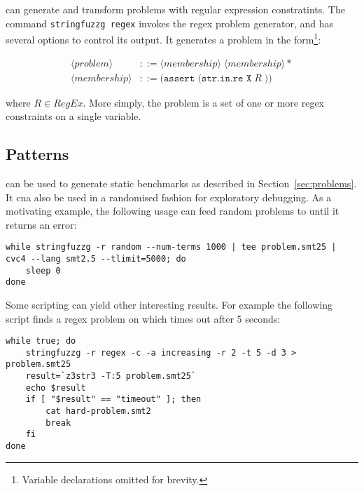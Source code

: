         \fuzzer{} can generate and transform problems with regular expression constratints. The command \texttt{stringfuzzg regex} invokes the regex problem generator, and has several options to control its output. It generates a problem in the form\footnote{Variable declarations omitted for brevity.}:

        \begin{align*}
            \langle problem \rangle  & ::= \langle membership \rangle \; \langle membership \rangle * \\
            \langle membership \rangle & ::= \texttt{(assert (str.in.re X}\; R\; \texttt{))}
        \end{align*}


        where $R \in RegEx$. More simply, the problem is a set of one or more regex constraints on a single variable.


    \subsection{Patterns}

        \fuzzer{} can be used to generate static benchmarks as described in Section~\ref{sec:problems}. It cna also be used in a randomised fashion for exploratory debugging. As a motivating example, the following usage can feed random problems to \cvc{} until it returns an error:

        {\scriptsize\begin{verbatim}
while stringfuzzg -r random --num-terms 1000 | tee problem.smt25 | cvc4 --lang smt2.5 --tlimit=5000; do
    sleep 0
done\end{verbatim}}

        Some \unix{} scripting can yield other interesting results. For example the following script finds a regex problem on which \us{} times out after 5 seconds:

        {\scriptsize\begin{verbatim}while true; do
    stringfuzzg -r regex -c -a increasing -r 2 -t 5 -d 3 > problem.smt25
    result=`z3str3 -T:5 problem.smt25`
    echo $result
    if [ "$result" == "timeout" ]; then
        cat hard-problem.smt2
        break
    fi
done\end{verbatim}}
